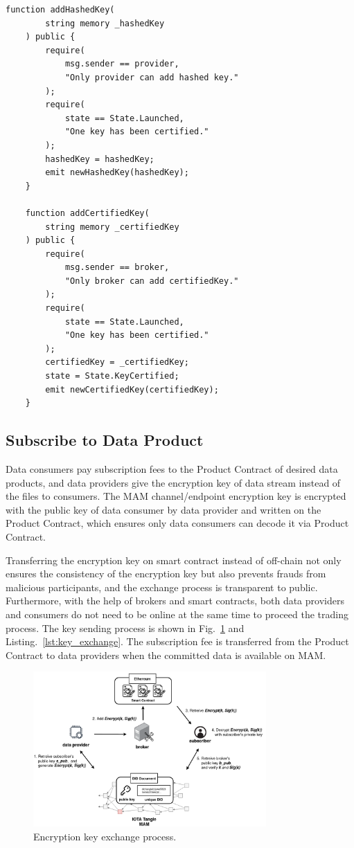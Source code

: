 \documentclass[conference]{IEEEtran}
\begin{document}
\begin{lstlisting}[caption={Functions of hased key update and certified key update}, label={lst:key_certification}, frame=single]
    function addHashedKey(
        string memory _hashedKey
    ) public {
        require(
            msg.sender == provider,
            "Only provider can add hashed key."
        );
        require(
            state == State.Launched,
            "One key has been certified."
        );
        hashedKey = hashedKey;
        emit newHashedKey(hashedKey);
    }
    	
    function addCertifiedKey(
        string memory _certifiedKey
    ) public {
        require(
            msg.sender == broker,
            "Only broker can add certifiedKey."
        );
        require(
            state == State.Launched,
            "One key has been certified."
        );
        certifiedKey = _certifiedKey;
        state = State.KeyCertified;
        emit newCertifiedKey(certifiedKey);
    }
\end{lstlisting}

\subsection{Subscribe to Data Product}
Data consumers pay subscription fees to the Product Contract of desired data products, and data providers give the encryption key of data stream instead of the files to consumers. The MAM channel/endpoint encryption key is encrypted with the public key of data consumer by data provider and written on the Product Contract, which ensures only data consumers can decode it via Product Contract.

Transferring the encryption key on smart contract instead of off-chain not only ensures the consistency of the encryption key but also prevents frauds from malicious participants, and the exchange process is transparent to public. Furthermore, with the help of brokers and smart contracts, both data providers and consumers do not need to be online at the same time to proceed the trading process. The key sending process is shown in Fig.~\ref{fig:key_exchange} and Listing.~\ref{lst:key_exchange}. The subscription fee is transferred from the Product Contract to data providers when the committed data is available on MAM.

\begin{figure}[!t]
    \centering
    \includegraphics[width=3.5in]{key_exchange}
    \caption{Encryption key exchange process.}
    \label{fig:key_exchange}
\end{figure}
\end{document}
